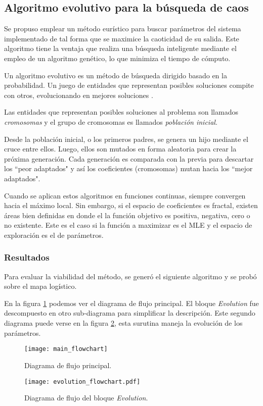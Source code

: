 \subsection{Algoritmo evolutivo para la búsqueda de caos}

Se propuso emplear un método eurístico para buscar parámetros del sistema implementado de tal forma que se maximice la caoticidad de su salida.
Este algoritmo tiene la ventaja que realiza una búsqueda inteligente mediante el empleo de un algoritmo genético, lo que minimiza el tiempo de cómputo.

Un algoritmo evolutivo es un método de búsqueda dirigido basado en la probabilidad.
Un juego de entidades que representan posibles soluciones compite con otros, evolucionando en mejores soluciones \cite{Weise2009}.

Las entidades que representan posibles soluciones al problema son llamados \textit{cromosomas} y el grupo de cromosomas es llamados \textit{población inicial}.

Desde la población inicial, o los primeros padres, se genera un hijo mediante el cruce entre ellos.
Luego, ellos son mutados en forma aleatoria para crear la próxima generación.
Cada generación es comparada con la previa para descartar los ``peor adaptados" y así los coeficientes (cromosomas) mutan hacia los ``mejor adaptados".

Cuando se aplican estos algoritmos en funciones continuas, siempre convergen hacia el máximo local.
Sin embargo, si el espacio de coeficientes es fractal, existen áreas bien definidas en donde el la función objetivo es positiva, negativa, cero o no existente.
Este es el caso si la función a maximizar es el MLE y el espacio de exploración es el de parámetros.

\subsubsection{Resultados}

Para evaluar la viabilidad del método, se generó el siguiente algoritmo y se probó sobre el mapa logístico.

En la figura \ref{fig:diagramaflujo1} podemos ver el diagrama de flujo principal.
El bloque \textit{Evolution} fue descompuesto en otro sub-diagrama para simplificar la descripción.
Este segundo diagrama puede verse en la figura \ref{fig:diagramaflujo2}, esta surutina maneja la evolución de los parámetros.
%
\begin{figure}
	\centering
	\texttt{[image: main\_flowchart]}\\
	\caption{Diagrama de flujo principal.}
	\label{fig:diagramaflujo1}
\end{figure}
%
\begin{figure}
	\centering
	\texttt{[image: evolution\_flowchart.pdf]}\\
	\caption{Diagrama de flujo del bloque \textit{Evolution}.}\label{fig:diagramaflujo2}
\end{figure}

